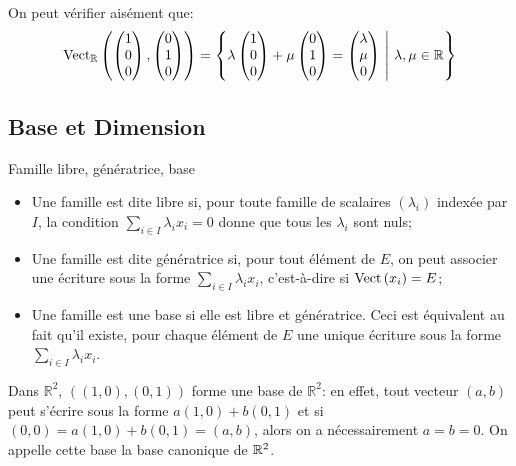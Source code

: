 \documentclass{classe}
\begin{document}
\begin{example}
	On peut vérifier aisément que:
	\begin{equation*}
		\operatorname{Vect}_{\mathbb{R}}\left( \begin{pmatrix}
			1\\0\\0
		\end{pmatrix}, \begin{pmatrix}
		0\\1\\0
\end{pmatrix}\right) = \left\{ \lambda\begin{pmatrix}
	1\\0\\0
\end{pmatrix} + \mu\begin{pmatrix}
0 \\ 1\\0
\end{pmatrix} = \begin{pmatrix}
\lambda \\ \mu \\0
\end{pmatrix} \ \middle| \ \lambda, \mu \in \mathbb{R}\right\}
	\end{equation*}
\end{example}

\subsection{Base et Dimension}
\begin{définition}{Famille libre, génératrice, base}{}
\begin{itemize}
\item Une famille est dite libre si, pour toute famille de scalaires $(\lambda_i)$ indexée par $I$, la condition $\sum_{i\in I} \lambda_i x_i = 0$ donne que tous les $\lambda_i$ sont nuls;
\item Une famille est dite génératrice si, pour tout élément de $E$, on peut associer une écriture sous la forme $\sum_{i\in I} \lambda_i x_i$, c'est-à-dire si $\operatorname{Vect}\left( x_{i} \right) = E$;
\item Une famille est une base si elle est libre et génératrice. Ceci est équivalent au fait qu'il existe, pour chaque élément de $E$ une unique écriture sous la forme $\sum_{i\in I} \lambda_i x_i$.
\end{itemize}
\end{définition}

\begin{example}
Dans $\mathbb{R}^2$, $((1, 0),(0, 1))$ forme une base de $\mathbb{R}^2$: en effet, tout vecteur $(a, b)$ peut s'écrire sous la forme $a(1, 0) + b(0, 1)$ et si $(0, 0) = a(1, 0) + b(0, 1) = (a, b)$, alors on a nécessairement $a=b=0$.
On appelle cette base la base canonique de $\mathbb{R}^{2}$.
\end{example}
\end{document}

